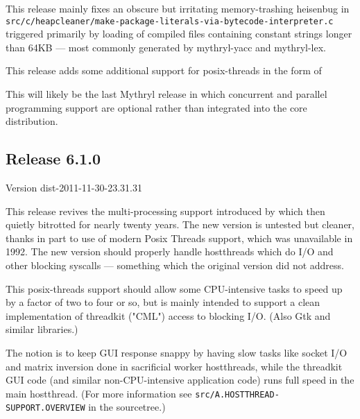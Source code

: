 This release mainly fixes an obscure but irritating memory-trashing heisenbug 
in {\tt src/c/heapcleaner/make-package-literals-via-bytecode-interpreter.c} 
triggered primarily by loading of compiled files containing constant strings 
longer than 64KB --- most commonly generated by mythryl-yacc and mythryl-lex. 

This release adds some additional support for posix-threads in the form of\newline
{}\newline
{}\newline
{}\newline

This will likely be the last Mythryl release in which concurrent and parallel  
programming support are optional rather than integrated into the core distribution.

\cutend*


\subsection{Release 6.1.0}
\label{section:src:release-6.1.0}

Version dist-2011-11-30-23.31.31 

This release revives the multi-processing support introduced by 
which then quietly bitrotted for nearly twenty years.  The new version is untested but cleaner, thanks in part 
to use of modern Posix Threads support, which was unavailable in 1992.  The new version should properly handle hostthreads which 
do I/O and other blocking syscalls --- something which the original version did not address. 

This posix-threads support should allow some CPU-intensive tasks to speed up by 
a factor of two to four or so, but is mainly intended to support a clean implementation 
of threadkit ("CML") access to blocking I/O.  (Also Gtk and similar libraries.) 

The notion is to keep GUI response snappy by having slow tasks like 
socket I/O and matrix inversion done in sacrificial worker hostthreads, 
while the threadkit GUI code (and similar non-CPU-intensive 
application code) runs full speed in the main hostthread.  (For more 
information see {\tt src/A.HOSTTHREAD-SUPPORT.OVERVIEW} in the sourcetree.) 

